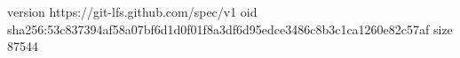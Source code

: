 version https://git-lfs.github.com/spec/v1
oid sha256:53c837394af58a07bf6d1d0f01f8a3df6d95edce3486c8b3c1ca1260e82c57af
size 87544
